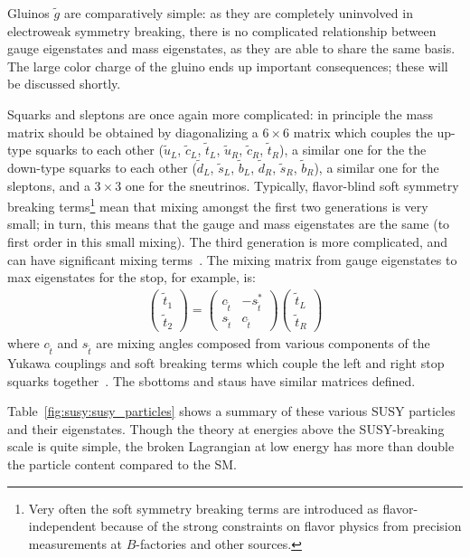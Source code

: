 Gluinos $\tilde{g}$ are comparatively simple: as they are completely uninvolved in electroweak symmetry breaking, there is no complicated relationship between gauge eigenstates and mass eigenstates, as they are able to share the same basis. The large color charge of the gluino ends up important consequences; these will be discussed shortly.

Squarks and sleptons are once again more complicated: in principle the mass matrix should be obtained by diagonalizing a $6\times6$ matrix which couples the up-type squarks to each other ($\tilde{u}_L$, $\tilde{c}_L$, $\tilde{t}_L$, $\tilde{u}_R$, $\tilde{c}_R$, $\tilde{t}_R$), a similar one for the the down-type squarks to each other ($\tilde{d}_L$, $\tilde{s}_L$, $\tilde{b}_L$, $\tilde{d}_R$, $\tilde{s}_R$, $\tilde{b}_R$), a similar one for the sleptons, and a $3\times3$ one for the sneutrinos. Typically, flavor-blind soft symmetry breaking terms\footnote{Very often the soft symmetry breaking terms are introduced as flavor-independent because of the strong constraints on flavor physics from precision measurements at $B$-factories and other sources.} mean that mixing amongst the first two generations is very small; in turn, this means that the gauge and mass eigenstates are the same (to first order in this small mixing). The third generation is more complicated, and can have significant mixing terms~\cite{Martin1997}. The mixing matrix from gauge eigenstates to max eigenstates for the stop, for example, is:
%
\begin{align}
\left(\begin{array}{c}
\tilde{t}_1\\
\tilde{t}_2
\end{array} \right) = 
\left( \begin{array}{cc}
c_{\tilde{t}} & -s_{\tilde{t}}^* \\
s_{\tilde{t}} & c_{\tilde{t}}
\end{array}\right)
\left(\begin{array}{c}
\tilde{t}_L\\
\tilde{t}_R
\end{array} \right)
\end{align}
%
where $c_{\tilde{t}}$ and $s_{\tilde{t}}$ are mixing angles composed from various components of the Yukawa couplings and soft breaking terms which couple the left and right stop squarks together~\cite{Martin1997}. The sbottoms and staus have similar matrices defined.

Table~\ref{fig:susy:susy_particles} shows a summary of these various SUSY particles and their eigenstates. Though the theory at energies above the SUSY-breaking scale is quite simple, the broken Lagrangian at low energy has more than double the particle content compared to the SM.


